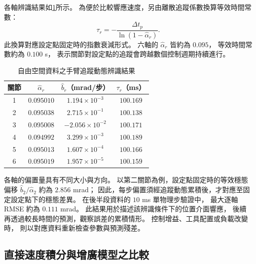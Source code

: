 各軸辨識結果如\cref{tab:ch4_arm_identification_parameters}所示。
為便於比較響應速度，另由離散追蹤係數換算等效時間常數：
\begin{equation}
    \tau_r=-\frac{\Delta t_p}{\ln(1-\hat\alpha_r)}.
    \label{eq:ch4_arm_equivalent_time_constant}
\end{equation}
此換算對應設定點固定時的指數衰減形式。
六軸的 $\hat\alpha_r$ 皆約為 $0.095$，
等效時間常數約為 $0.100$ s，
表示關節對設定點的追蹤會跨越數個控制週期持續進行。

\begin{table}[htbp]
    \centering
    \caption{自由空間資料之手臂追蹤動態辨識結果}
    \label{tab:ch4_arm_identification_parameters}
    \begingroup
    \small
    \renewcommand{\arraystretch}{1.2}
    \begin{tabular}{c c c c}
        \hline
        關節 & $\hat\alpha_r$ & $\hat b_r$（mrad/步） & $\tau_r$（ms） \\
        \hline
        1 & $0.095010$ & $1.194\times10^{-3}$  & $100.169$ \\
        2 & $0.095038$ & $2.715\times10^{-1}$  & $100.138$ \\
        3 & $0.095008$ & $-2.056\times10^{-2}$ & $100.171$ \\
        4 & $0.094992$ & $3.299\times10^{-3}$  & $100.189$ \\
        5 & $0.095013$ & $1.607\times10^{-4}$  & $100.166$ \\
        6 & $0.095019$ & $1.957\times10^{-5}$  & $100.159$ \\
        \hline
    \end{tabular}
    \endgroup
\end{table}

各軸的偏置量具有不同大小與方向。
以第二關節為例，設定點固定時的等效穩態偏移
$\hat b_2/\hat\alpha_2$ 約為 $2.856$ mrad；
因此，每步偏置須經追蹤動態累積後，才對應至固定設定點下的穩態差異。
在後半段資料的 $10$ ms 單物理步驗證中，
最大逐軸 RMSE 約為 $0.111$ mrad。
此結果用於描述該辨識條件下的位置介面響應，
後續再透過較長時間的預測，觀察誤差的累積情形。
控制增益、工具配置或負載改變時，
則以對應資料重新檢查參數與預測殘差。

\subsection{直接速度積分與增廣模型之比較}
\label{subsec:direct_augmented_model_comparison}

